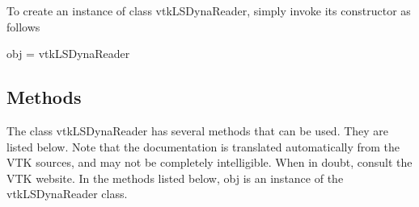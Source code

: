 To create an instance of class vtk\-L\-S\-Dyna\-Reader, simply invoke its constructor as follows \begin{DoxyVerb}  obj = vtkLSDynaReader
\end{DoxyVerb}
 \hypertarget{vtkwidgets_vtkxyplotwidget_Methods}{}\subsection{Methods}\label{vtkwidgets_vtkxyplotwidget_Methods}
The class vtk\-L\-S\-Dyna\-Reader has several methods that can be used. They are listed below. Note that the documentation is translated automatically from the V\-T\-K sources, and may not be completely intelligible. When in doubt, consult the V\-T\-K website. In the methods listed below, {\ttfamily obj} is an instance of the vtk\-L\-S\-Dyna\-Reader class. 
